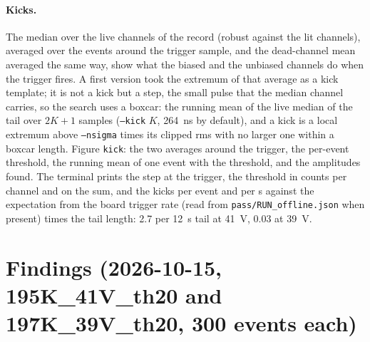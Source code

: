 \documentclass[11pt]{article}
\newcommand{\code}[1]{\texttt{#1}}
\newcommand{\us}{\textmu s}
\begin{document}
\paragraph{Kicks.} The median over the live channels of the record
(robust against the lit channels), averaged over the events around the
trigger sample, and the dead-channel mean averaged the same way, show
what the biased and the unbiased channels do when the trigger fires. A
first version took the extremum of that average as a kick template; it
is not a kick but a step, the small pulse that the median channel
carries, so the search uses a boxcar: the running mean of the live
median of the tail over $2K + 1$ samples (\code{--kick} $K$, 264~ns by
default), and a kick is a local extremum above \code{--nsigma} times its
clipped rms with no larger one within a boxcar length. Figure
\code{kick}: the two averages around the trigger, the per-event
threshold, the running mean of one event with the threshold, and the
amplitudes found. The terminal prints the step at the trigger, the
threshold in counts per channel and on the sum, and the kicks per event
and per \us{} against the expectation from the board trigger rate (read
from \code{pass/RUN\_offline.json} when present) times the tail length:
2.7 per 12~\us{} tail at 41~V, 0.03 at 39~V.

\section{Findings (2026-10-15, 195K\_41V\_th20 and 197K\_39V\_th20, 300 events each)}
\end{document}
